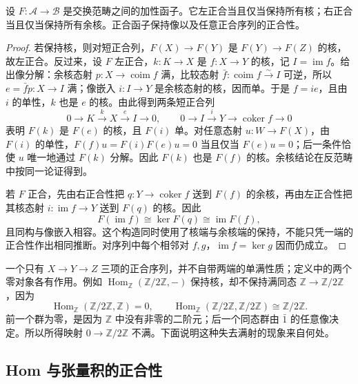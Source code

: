 \begin{theorem}\label{b4:thm:exact-functor-kernels}
	设 \(F:\mathcal A\to\mathcal B\) 是交换范畴之间的加性函子。它左正合当且仅当保持所有核；右正合当且仅当保持所有余核。正合函子保持像以及任意正合序列的正合性。
\end{theorem}
\begin{proof}
	若保持核，则对短正合列，\(F(X)\to F(Y)\) 是 \(F(Y)\to F(Z)\) 的核，故左正合。反过来，设 \(F\) 左正合，\(k:K\to X\) 是 \(f:X\to Y\) 的核，记 \(I=\operatorname{im}f\)。给出像分解：余核态射 \(p:X\to\operatorname{coim}f\) 满，比较态射 \(\bar f:\operatorname{coim}f\xrightarrow{\sim}I\) 可逆，所以 \(e=\bar f p:X\to I\) 满；像嵌入 \(i:I\to Y\) 是余核态射的核，因而单。于是 \(f=ie\)，且由 \(i\) 的单性，\(k\) 也是 \(e\) 的核。由此得到两条短正合列
	\[
		0\to K\xrightarrow k X\xrightarrow e I\to0,\qquad 0\to I\xrightarrow iY\to\operatorname{coker}f\to0
	\]
	表明 \(F(k)\) 是 \(F(e)\) 的核，且 \(F(i)\) 单。对任意态射 \(u:W\to F(X)\)，由 \(F(i)\) 的单性，\(F(f)u=F(i)F(e)u=0\) 当且仅当 \(F(e)u=0\)；后一条件恰使 \(u\) 唯一地通过 \(F(k)\) 分解。因此 \(F(k)\) 也是 \(F(f)\) 的核。余核结论在反范畴中按同一论证得到。

	若 \(F\) 正合，先由右正合性把 \(q:Y\to\operatorname{coker}f\) 送到 \(F(f)\) 的余核，再由左正合性把其核态射 \(i:\operatorname{im}f\to Y\) 送到 \(F(q)\) 的核。因此
	\[
		F(\operatorname{im}f)\cong\ker F(q)\cong\operatorname{im}F(f),
	\]
	且同构与像嵌入相容。这个构造同时使用了核端与余核端的保持，不能只凭一端的正合性作出相同推断。对序列中每个相邻对 \(f,g\)，\(\operatorname{im}f=\ker g\) 因而仍成立。
\end{proof}

一个只有 \(X\to Y\to Z\) 三项的正合序列，并不自带两端的单满性质；定义中的两个零对象各有作用。例如 \(\operatorname{Hom}_{\mathbb Z}(\mathbb Z/2\mathbb Z,-)\) 保持核，却不保持满同态 \(\mathbb Z\to\mathbb Z/2\mathbb Z\)，因为
\[
	\operatorname{Hom}_{\mathbb Z}(\mathbb Z/2\mathbb Z,\mathbb Z)=0,\qquad \operatorname{Hom}_{\mathbb Z}(\mathbb Z/2\mathbb Z,\mathbb Z/2\mathbb Z)\cong\mathbb Z/2\mathbb Z.
\]
前一个群为零，是因为 \(\mathbb Z\) 中没有非零的二阶元；后一个同态群由 \(\bar1\) 的任意像决定。所以所得映射 \(0\to\mathbb Z/2\mathbb Z\) 不满。下面说明这种失去满射的现象来自何处。

\subsection{Hom 与张量积的正合性}
\label{b4:subsec:0403:02}

